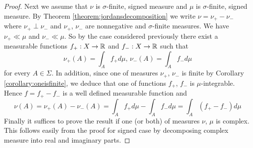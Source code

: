 \begin{proof}
Next we assume that $\nu$ is $\sigma$-finite, signed measure and $\mu$ is $\sigma$-finite, signed measure. By Theorem \ref{theorem:jordansdecomposition} we write $\nu = \nu_+ - \nu_-$ where $\nu_+ \perp \nu_-$ and $\nu_+$, $\nu_-$ are nonnegative and $\sigma$-finite measures. We have $\nu_+ \ll \mu$ and $\nu_- \ll \mu$. So by the case considered previously there exist a measurable functions $f_+:X\rightarrow {\mathbb R}$ and $f_-:X\rightarrow {\mathbb R}$ such that
$$\nu_+(A) = \int_A f_+d\mu,\,\nu_-(A) = \int_A f_-d\mu$$
for every $A\in \Sigma$. In addition, since one of measures $\nu_+$, $\nu_-$ is finite by Corollary \ref{corollary:oneisfinite}, we deduce that one of functions $f_+$, $f_-$ is $\mu$-integrable. Hence $f = f_+ - f_-$ is a well defined measurable function and
$$\nu(A) = \nu_+(A) - \nu_-(A) = \int_A f_+d\mu-\int_A f_-d\mu= \int_A(f_+-f_-)d\mu$$
Finally it suffices to prove the result if one (or both) of measures $\nu$, $\mu$ is complex. This follows easily from the proof for signed case by decomposing complex measure into real and imaginary parts.
\end{proof}






































































